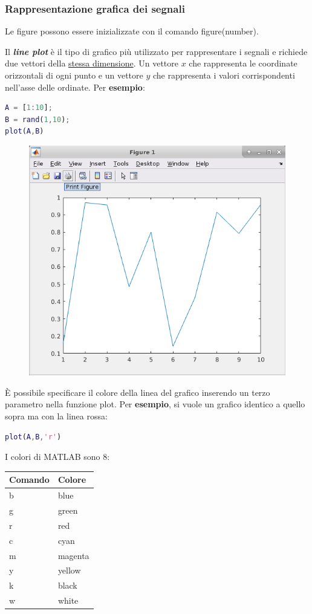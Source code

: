\documentclass[a4paper]{article}
\begin{document}
	\subsubsection{Rappresentazione grafica dei segnali}\label{MATLAB - Rappresentazione grafica dei segnali}
	
	Le figure possono essere inizializzate con il comando \textsf{figure(number)}.\newline
	
	\noindent
	Il \textbf{\emph{line plot}} è il tipo di grafico più utilizzato per rappresentare i segnali e richiede due vettori della \underline{stessa dimensione}. Un vettore $x$ che rappresenta le coordinate orizzontali di ogni punto e un vettore $y$ che rappresenta i valori corrispondenti nell'asse delle ordinate. Per \textcolor{Green4}{\textbf{esempio}}:
	\begin{lstlisting}[language=MATLAB]
A = [1:10];
B = rand(1,10);
plot(A,B)\end{lstlisting}
	\begin{figure}[!htp]
		\centering
		\includegraphics[width=.7\textwidth]{img/lab/visualizzazione-segnali_1.png}
	\end{figure}
	
	\noindent
	È possibile specificare il colore della linea del grafico inserendo un terzo parametro nella funzione \textsf{plot}. Per \textcolor{Green4}{\textbf{esempio}}, si vuole un grafico identico a quello sopra ma con la linea rossa:
	\begin{lstlisting}[language=MATLAB]
plot(A,B,'r')\end{lstlisting}
	I colori di MATLAB sono 8:
	\begin{table}[!htbp]
		\centering
		\begin{tabular}{@{} l l @{}}
			\toprule
			Comando		& Colore \\
			\midrule
			\textsf{b}	& blue \\
			\textsf{g}	& green \\
			\textsf{r}	& red \\
			\textsf{c}	& cyan \\
			\textsf{m}	& magenta \\
			\textsf{y}	& yellow \\
			\textsf{k}	& black \\
			\textsf{w}	& white \\
			\bottomrule
		\end{tabular}
	\end{table}\newpage
\end{document}
